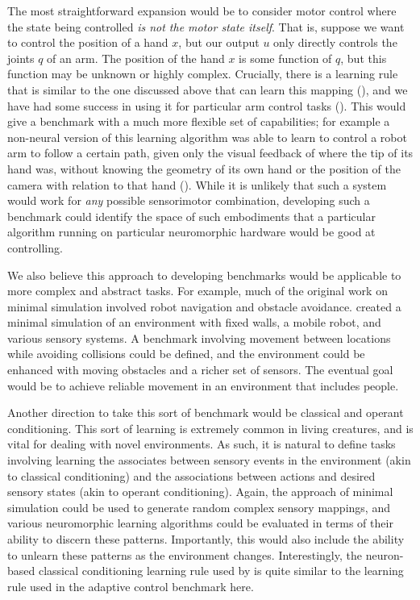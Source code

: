\documentclass{frontiersSCNS} %
\begin{document}
The most straightforward expansion would be to consider motor control where
the state being controlled \emph{is not the motor state itself}.  That is,
suppose we want to control the position of a hand $x$, but our output $u$
only directly controls the joints $q$ of an arm.  The position of the hand $x$
is some function of $q$, but this function may be unknown or highly complex.
Crucially, there is a learning rule that is similar to the one discussed above
that can learn this mapping (\citealt{adaptiveJacobian}), and we have had
some success in using it for particular arm control tasks (\citealt{dewolf2014}).
This would give a benchmark with a much more flexible set of capabilities;
for example a non-neural version of this learning algorithm was able to
learn to control a robot arm to follow a certain path, given only the
visual feedback of where the tip of its hand was, without knowing the
geometry of its own hand or the position of the camera with relation to that
hand (\citealt{adaptiveJacobian}).  While it is unlikely that such a
system would work for \emph{any} possible sensorimotor combination, developing
such a benchmark could identify the space of such embodiments that a
particular algorithm running on particular neuromorphic hardware would be
good at controlling.

We also believe this approach to developing benchmarks would be applicable
to more complex and abstract tasks.  For example, much of the original work
on minimal simulation involved robot navigation and obstacle avoidance.  
\cite{Jakobi97evolutionaryrobotics} created a
minimal simulation of an environment with fixed walls, a mobile robot, and
various sensory systems.  A benchmark involving movement between locations
while avoiding collisions could be defined, and the environment could be
enhanced with moving obstacles and a richer set of sensors.  The eventual
goal would be to achieve reliable movement in an environment that includes
people.

Another direction to take this sort of benchmark would be classical and
operant conditioning.  This sort of learning is extremely common in living
creatures, and is vital for dealing with novel environments.  As such,
it is natural to define tasks involving learning the associates between
sensory events in the environment (akin to classical conditioning) and the
associations between actions and desired sensory states (akin to operant
conditioning).  Again, the approach of minimal simulation could be used
to generate random complex sensory mappings, and various neuromorphic
learning algorithms could be evaluated in terms of their ability to
discern these patterns.  Importantly, this would also include the ability
to unlearn these patterns as the environment changes.  Interestingly, the
neuron-based classical conditioning learning rule used by \cite{verschure2003}
is quite similar to the learning rule used in the adaptive control benchmark
here.
\end{document}

